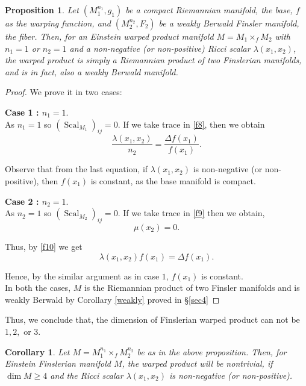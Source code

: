\documentclass[pdflatex,sn-mathphys-num]{sn-jnl}%
\newtheorem{corollary}{Corollary}[section]
\theoremstyle{thmstyleone}%
\newtheorem{proposition}[theorem]{Proposition}%
\theoremstyle{thmstyletwo}%
\theoremstyle{thmstylethree}%
\begin{document}
\vspace{0.15in}

 \begin{proposition}\label{prop5.1}
     Let $(M_1^{n_1},g_1)$ be a compact Riemannian manifold,  the base, $f$ as the  warping function, and $(M_2^{n_2},F_2)$ be a weakly Berwald Finsler manifold,  the fiber. Then, for an Einstein warped product manifold 
     $M = M_1\times_f M_2 $ with $n_1=1$ or $n_2=1$  and a non-negative (or non-positive) Ricci scalar $\lambda(x_1,x_2)$, the warped product is simply a Riemannian product of two Finslerian manifolds, and is  in fact, also a weakly Berwald manifold.
 \end{proposition}

 \begin{proof}
     We prove it in two cases:

 {\bf Case 1 : $n_1=1.$}\\

As $n_1=1$ so $(\operatorname{Scal}_{M_1})_{ij}=0.$ If we take trace in \eqref{f8}, then we obtain
$$\frac{\lambda(x_1,x_2)}{n_2}=  \frac{\Delta f(x_1)}{f (x_1)}.$$

Observe that from the last equation, if $\lambda(x_1,x_2)$ is non-negative (or non-positive), then $f(x_1)$ is constant,
as the base manifold is compact.

{\bf Case 2 : $n_2=1.$}\\

As $n_2=1$ so $(\operatorname{Scal}_{M_2})_{ij}=0.$ If we take trace in \eqref{f9} then we obtain,
   $$\mu(x_2)=0.$$

   Thus, by \eqref{f10} we get
   $$\lambda(x_1,x_2) f(x_1) = \Delta f(x_1).$$

Hence, by the similar argument as in case $1$, $f(x_1)$ is constant.\\ 
In both the cases, $M$ is the Riemannian product of two Finsler manifolds and is weakly Berwald by Corollary \ref{weakly}
proved in \S \ref{sec4}
\end{proof}

\vspace{0.15in}

Thus, we conclude that, the dimension of Finslerian warped product can not be $1, 2,$ or $3$.

\vspace{0.15in}

 \begin{corollary}
Let $M = M_1^{n_1}\times_f M_2^{n_2} $ be as in the above proposition.
Then, for  Einstein  Finslerian manifold $M$, the warped product will be nontrivial, if $\operatorname{dim}M \geq 4$ and the Ricci scalar $ \lambda(x_1,x_2)$ is non-negative (or non-positive).

 \end{corollary}
\end{document}
